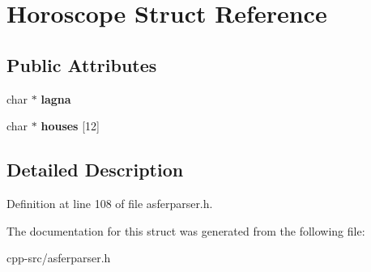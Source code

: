 \hypertarget{structHoroscope}{\section{Horoscope Struct Reference}
\label{structHoroscope}
}
\subsection*{Public Attributes}
\begin{DoxyCompactItemize}
\item 
\hypertarget{structHoroscope_ad929180e93ca219355dbf6c4ae9e7ff3}{char $\ast$ {\bfseries lagna}}\label{structHoroscope_ad929180e93ca219355dbf6c4ae9e7ff3}

\item 
\hypertarget{structHoroscope_a69c3e9ec9313101b08810f767d02d2b4}{char $\ast$ {\bfseries houses} \mbox{[}12\mbox{]}}\label{structHoroscope_a69c3e9ec9313101b08810f767d02d2b4}

\end{DoxyCompactItemize}


\subsection{Detailed Description}


Definition at line 108 of file asferparser.\-h.



The documentation for this struct was generated from the following file\-:\begin{DoxyCompactItemize}
\item 
cpp-\/src/asferparser.\-h\end{DoxyCompactItemize}
